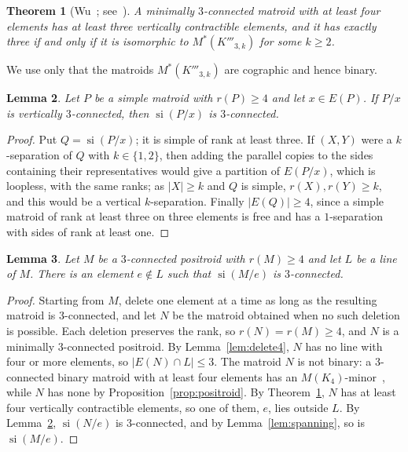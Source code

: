 \documentclass[11pt]{amsart}
\newtheorem{theorem}{Theorem}[section]
\newtheorem{lemma}[theorem]{Lemma}
\theoremstyle{definition}
\theoremstyle{remark}
\numberwithin{equation}{section}
\newcommand{\si}{\operatorname{si}}
\begin{document}
\begin{theorem}[{Wu~\cite{Wu98}; see~\cite[Theorem~12.6]{Oxl96}}]\label{thm:wu}
A minimally $3$-connected matroid with at least four elements has at least three vertically contractible elements, and it has exactly three if and only if it is isomorphic to $M^*(K'''_{3,k})$ for some $k\ge2$.
\end{theorem}

We use only that the matroids $M^*(K'''_{3,k})$ are cographic and hence binary.

\begin{lemma}\label{lem:vertical}
Let $P$ be a simple matroid with $r(P)\ge4$ and let $x\in E(P)$. If $P/x$ is vertically $3$-connected, then $\si(P/x)$ is $3$-connected.
\end{lemma}

\begin{proof}
Put $Q=\si(P/x)$; it is simple of rank at least three. If $(X,Y)$ were a $k$-separation of $Q$ with $k\in\{1,2\}$, then adding the parallel copies to the sides containing their representatives would give a partition of $E(P/x)$, which is loopless, with the same ranks; as $|X|\ge k$ and $Q$ is simple, $r(X),r(Y)\ge k$, and this would be a vertical $k$-separation. Finally $|E(Q)|\ge4$, since a simple matroid of rank at least three on three elements is free and has a $1$-separation with sides of rank at least one.
\end{proof}

\begin{lemma}\label{lem:wu}
Let $M$ be a $3$-connected positroid with $r(M)\ge4$ and let $L$ be a line of $M$. There is an element $e\notin L$ such that $\si(M/e)$ is $3$-connected.
\end{lemma}

\begin{proof}
Starting from $M$, delete one element at a time as long as the resulting matroid is $3$-connected, and let $N$ be the matroid obtained when no such deletion is possible. Each deletion preserves the rank, so $r(N)=r(M)\ge4$, and $N$ is a minimally $3$-connected positroid. By Lemma~\ref{lem:delete4}, $N$ has no line with four or more elements, so $|E(N)\cap L|\le3$. The matroid $N$ is not binary: a $3$-connected binary matroid with at least four elements has an $M(K_4)$-minor~\cite[Corollary~12.2.13]{Oxl11}, while $N$ has none by Proposition~\ref{prop:positroid}. By Theorem~\ref{thm:wu}, $N$ has at least four vertically contractible elements, so one of them, $e$, lies outside $L$. By Lemma~\ref{lem:vertical}, $\si(N/e)$ is $3$-connected, and by Lemma~\ref{lem:spanning}, so is $\si(M/e)$.
\end{proof}
\end{document}
